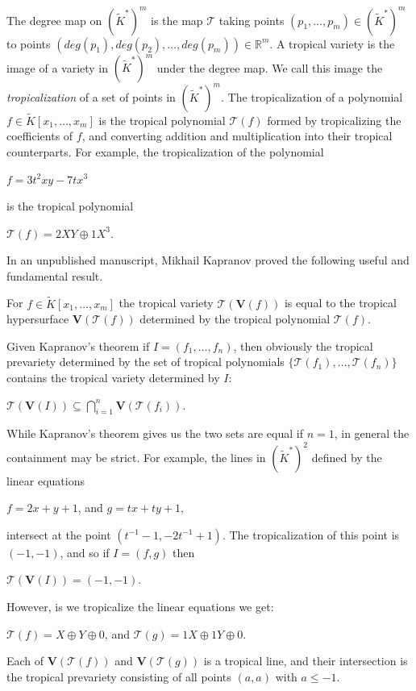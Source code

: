 \documentclass{article}
\begin{document}
The degree map on $(\tilde{K}^{*})^{m}$ is the map $\mathcal{T}$ taking points $(p_{1},\ldots,p_{m}) \in (\tilde{K}^{*})^{m}$ to points $(deg(p_{1}),deg(p_{2}),\ldots,deg(p_{m})) \in \mathbb{R}^{m}$. A tropical variety is the image of a variety in $(\tilde{K}^{*})^{m}$ under the degree map. We call this image the \emph{tropicalization} of a set of points in $(\tilde{K}^{*})^{m}$. The tropicalization of a polynomial $f \in \tilde{K}[x_{1},\ldots,x_{m}]$ is the tropical polynomial $\mathcal{T}(f)$ formed by tropicalizing the coefficients of $f$, and converting addition and multiplication into their tropical counterparts. For example, the tropicalization of the polynomial 
\begin{center}
  $f = 3t^{2}xy - 7tx^{3}$ 
\end{center}
is the tropical polynomial
\begin{center}
  $\mathcal{T}(f) = 2XY \oplus 1X^{3}$.
\end{center}

In an unpublished manuscript, Mikhail Kapranov proved the following useful and fundamental result.

\begin{thm}
  For $f \in \tilde{K}[x_{1},\ldots,x_{m}]$ the tropical variety $\mathcal{T}(\textbf{V}(f))$ is equal to the tropical hypersurface $\textbf{V}(\mathcal{T}(f))$ determined by the tropical polynomial $\mathcal{T}(f)$.
\end{thm}

Given Kapranov's theorem if $I = (f_{1},\ldots,f_{n})$, then obviously the tropical prevariety determined by the set of tropical polynomials $\{\mathcal{T}(f_{1}),\ldots,\mathcal{T}(f_{n})\}$ contains the tropical variety determined by $I$:
\begin{center}
  $\mathcal{T}(\textbf{V}(I)) \subseteq \bigcap_{i = 1}^{n} \textbf{V}(\mathcal{T}(f_{i}))$.
\end{center}

While Kapranov's theorem gives us the two sets are equal if $n = 1$, in general the containment may be strict. For example, the lines in $(\tilde{K}^{*})^{2}$ defined by the linear equations
\begin{center}
  $f = 2x + y + 1$, \hspace{.1 in} and \hspace{.1 in} $g = tx + ty + 1$,
\end{center}
intersect at the point $(t^{-1}-1,-2t^{-1}+1)$. The tropicalization of this point is $(-1,-1)$, and so if $I = (f,g)$ then
\begin{center}
  $\mathcal{T}(\textbf{V}(I)) = (-1,-1)$.
\end{center}
However, is we tropicalize the linear equations we get:
\begin{center}
  $\mathcal{T}(f) = X \oplus Y \oplus 0$, \hspace{.1 in} and \hspace{.1 in} $\mathcal{T}(g) = 1X \oplus 1Y \oplus 0$.
\end{center}
Each of $\textbf{V}(\mathcal{T}(f))$ and $\textbf{V}(\mathcal{T}(g))$ is a tropical line, and their intersection is the tropical prevariety consisting of all points $(a,a)$ with $a \leq -1$.
\end{document}
